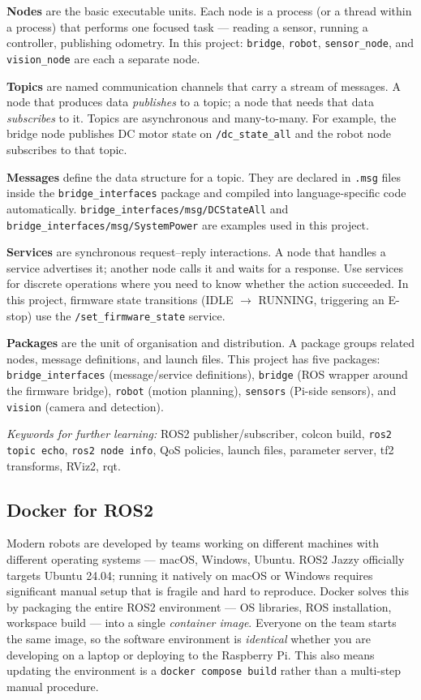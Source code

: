 \documentclass{ol-softwaremanual}
\begin{document}
\textbf{Nodes} are the basic executable units.
Each node is a process (or a thread within a process) that performs one focused task ---
reading a sensor, running a controller, publishing odometry.
In this project: \texttt{bridge}, \texttt{robot}, \texttt{sensor\_node}, and
\texttt{vision\_node} are each a separate node.

\textbf{Topics} are named communication channels that carry a stream of messages.
A node that produces data \emph{publishes} to a topic; a node that needs that data
\emph{subscribes} to it.
Topics are asynchronous and many-to-many.
For example, the bridge node publishes DC motor state on \texttt{/dc\_state\_all}
and the robot node subscribes to that topic.

\textbf{Messages} define the data structure for a topic.
They are declared in \texttt{.msg} files inside the \texttt{bridge\_interfaces} package
and compiled into language-specific code automatically.
\texttt{bridge\_interfaces/msg/DCStateAll} and \texttt{bridge\_interfaces/msg/SystemPower}
are examples used in this project.

\textbf{Services} are synchronous request--reply interactions.
A node that handles a service advertises it; another node calls it and waits for
a response.
Use services for discrete operations where you need to know whether the action
succeeded.
In this project, firmware state transitions (IDLE $\to$ RUNNING, triggering an E-stop)
use the \texttt{/set\_firmware\_state} service.

\textbf{Packages} are the unit of organisation and distribution.
A package groups related nodes, message definitions, and launch files.
This project has five packages:
\texttt{bridge\_interfaces} (message/service definitions),
\texttt{bridge} (ROS wrapper around the firmware bridge),
\texttt{robot} (motion planning),
\texttt{sensors} (Pi-side sensors), and
\texttt{vision} (camera and detection).

\medskip
\noindent\textit{Keywords for further learning:}
ROS2 publisher/subscriber, colcon build, \texttt{ros2 topic echo}, \texttt{ros2 node info},
QoS policies, launch files, parameter server, tf2 transforms, RViz2, rqt.

\subsection{Docker for ROS2}

Modern robots are developed by teams working on different machines with different
operating systems --- macOS, Windows, Ubuntu.
ROS2 Jazzy officially targets Ubuntu 24.04; running it natively on macOS or Windows
requires significant manual setup that is fragile and hard to reproduce.
Docker solves this by packaging the entire ROS2 environment --- OS libraries,
ROS installation, workspace build --- into a single \emph{container image}.
Everyone on the team starts the same image, so the software environment is
\emph{identical} whether you are developing on a laptop or deploying to the Raspberry Pi.
This also means updating the environment is a \texttt{docker compose build} rather than
a multi-step manual procedure.
\end{document}
